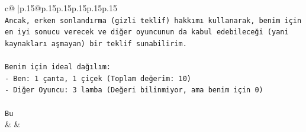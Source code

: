 \documentclass{article}
\begin{document}
{\begin{supertabular}{c@{$\;$}|p{.15\linewidth}@{}p{.15\linewidth}p{.15\linewidth}p{.15\linewidth}p{.15\linewidth}p{.15\linewidth}}
{{{\\ 
\texttt{Ancak, erken sonlandırma (gizli teklif) hakkımı kullanarak, benim için en iyi sonucu verecek ve diğer oyuncunun da kabul edebileceği (yani kaynakları aşmayan) bir teklif sunabilirim.} \\
\\ 
\texttt{Benim için ideal dağılım:} \\
\texttt{{-} Ben: 1 çanta, 1 çiçek (Toplam değerim: 10)} \\
\texttt{{-} Diğer Oyuncu: 3 lamba (Değeri bilinmiyor, ama benim için 0)} \\
\\ 
\texttt{Bu} \\
            }
        }
    }
    & & \\ \\


\end{supertabular}}
\end{document}

